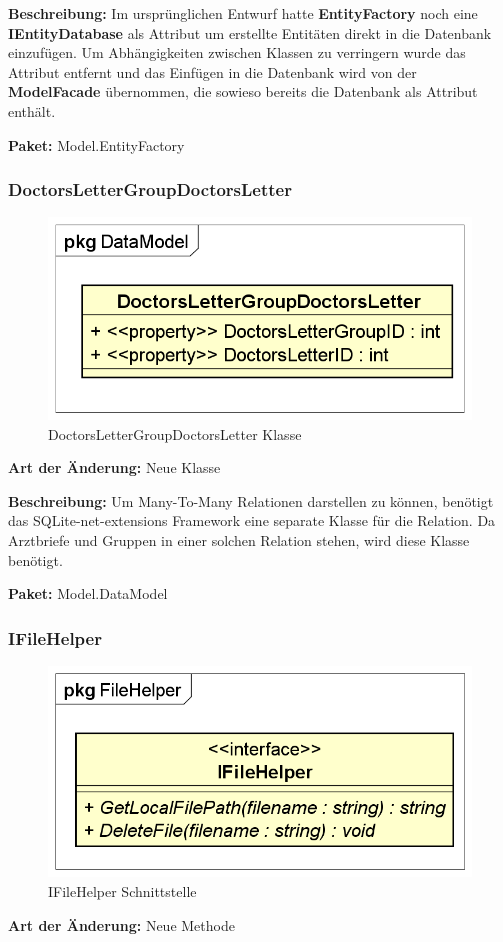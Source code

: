 \documentclass[a4paper]{scrreprt}
\begin{document}
\textbf{Beschreibung:} Im ursprünglichen Entwurf hatte \textbf{EntityFactory} noch eine \textbf{IEntityDatabase} als Attribut um erstellte Entitäten direkt in die Datenbank einzufügen. Um Abhängigkeiten zwischen Klassen zu verringern wurde das Attribut entfernt und das Einfügen in die Datenbank wird von der \textbf{ModelFacade} übernommen, die sowieso bereits die Datenbank als Attribut enthält.

\textbf{Paket:} Model.EntityFactory

\subsubsection{DoctorsLetterGroupDoctorsLetter}
\begin{figure}[H]
\centering
\includegraphics[width=0.75\textheight]{graphics/Klassendiagramme/Model/DoctorsLetterGroupDoctorsLetter.png}
\caption{DoctorsLetterGroupDoctorsLetter Klasse}
\end{figure}
\textbf{Art der Änderung:} Neue Klasse

\textbf{Beschreibung:} Um Many-To-Many Relationen darstellen zu können, benötigt das SQLite-net-extensions Framework eine separate Klasse für die Relation. Da Arztbriefe und Gruppen in einer solchen Relation stehen, wird diese Klasse benötigt.

\textbf{Paket:} Model.DataModel

\subsubsection{IFileHelper}
\begin{figure}[H]
\centering
\includegraphics[width=0.75\textheight]{graphics/Klassendiagramme/Model/IFileHelper.png}
\caption{IFileHelper Schnittstelle}
\end{figure}
\textbf{Art der Änderung:} Neue Methode
\end{document}
